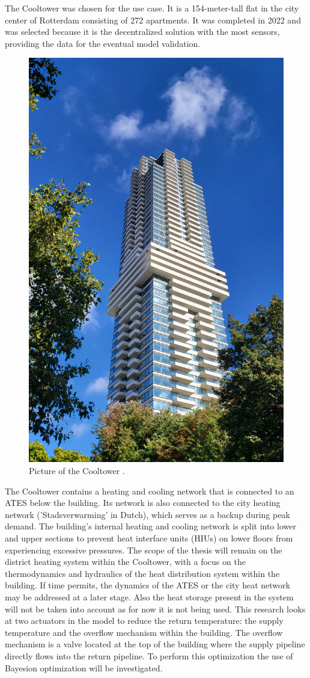 The Cooltower was chosen for the use case. It is a 154-meter-tall flat in the city center of Rotterdam consisting of 272 apartments. It was completed in 2022 and was selected because it is the decentralized solution with the most sensors, providing the data for the eventual model validation.

\begin{figure}[h]
    \centering
    \includegraphics[width=0.5\linewidth]{figuresLIT/Cooltorenfoto.jpg}
    \caption{Picture of the Cooltower \cite{fotoCooltoren}.}
    \label{fig:Cooltoren}
\end{figure}

The Cooltower contains a heating and cooling network that is connected to an ATES below the building. Its network is also connected to the city heating network ('Stadsverwarming' in Dutch), which serves as a backup during peak demand. The building's internal heating and cooling network is split into lower and upper sections to prevent heat interface units (HIUs) on lower floors from experiencing excessive pressures. The scope of the thesis will remain on the district heating system within the Cooltower, with a focus on the thermodynamics and hydraulics of the heat distribution system within the building. If time permits, the dynamics of the ATES or the city heat network may be addressed at a later stage. Also the heat storage present in the system will not be taken into account as for now it is not being used.
This research looks at two actuators in the model to reduce the return temperature: the supply temperature and the overflow mechanism within the building. The overflow mechanism is a valve located at the top of the building where the supply pipeline directly flows into the return pipeline. To perform this optimization the use of Bayesion optimization will be investigated. 

